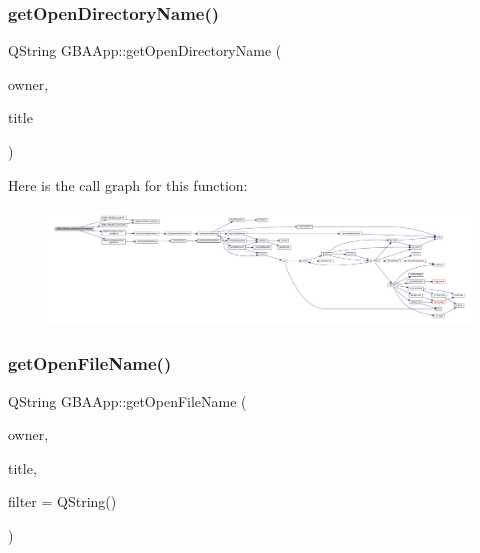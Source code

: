 \subsubsection{\texorpdfstring{get\+Open\+Directory\+Name()}{getOpenDirectoryName()}}
{\footnotesize\ttfamily Q\+String G\+B\+A\+App\+::get\+Open\+Directory\+Name (\begin{DoxyParamCaption}\item[{Q\+Widget $\ast$}]{owner,  }\item[{const Q\+String \&}]{title }\end{DoxyParamCaption})}

Here is the call graph for this function\+:
\nopagebreak
\begin{figure}[H]
\begin{center}
\leavevmode
\includegraphics[width=350pt]{class_q_g_b_a_1_1_g_b_a_app_a6456a6d7b74fe7fdfc6a92205e6c1b0b_cgraph}
\end{center}
\end{figure}
\mbox{\label{class_q_g_b_a_1_1_g_b_a_app_a44b0a376cc16d17e904f5d750a854380}} 
\subsubsection{\texorpdfstring{get\+Open\+File\+Name()}{getOpenFileName()}}
{\footnotesize\ttfamily Q\+String G\+B\+A\+App\+::get\+Open\+File\+Name (\begin{DoxyParamCaption}\item[{Q\+Widget $\ast$}]{owner,  }\item[{const Q\+String \&}]{title,  }\item[{const Q\+String \&}]{filter = {\ttfamily QString()} }\end{DoxyParamCaption})}

